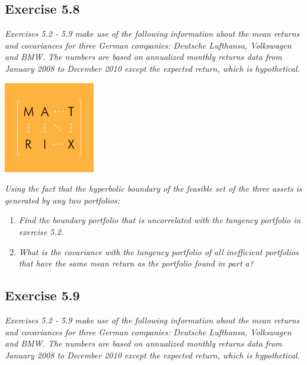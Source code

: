 \documentclass[]{book}
\theoremstyle{definition}
\theoremstyle{definition}
\theoremstyle{remark}
\begin{document}
\subsection{Exercise 5.8}\label{exercise-5.8}

\emph{Exercises 5.2 - 5.9 make use of the following information about
the mean returns and covariances for three German companies: Deutsche
Lufthansa, Volkswagen and BMW. The numbers are based on annualized
monthly returns data from January 2008 to December 2010 except the
expected return, which is hypothetical.} \citep[p.159]{book}

\begin{center}\includegraphics[width=150px]{figures/matrix} \end{center}

\emph{Using the fact that the hyperbolic boundary of the feasible set of
the three assets is generated by any two portfolios:}
\citep[p.160]{book}

\begin{enumerate}
\def\labelenumi{\alph{enumi}.}
\item
  \emph{Find the boundary portfolio that is uncorrelated with the
  tangency portfolio in exercise 5.2.} \citep[p.160]{book}
\item
  \emph{What is the covariance with the tangency portfolio of all
  inefficient portfolios that have the same mean return as the portfolio
  found in part a?} \citep[p.160]{book}
\end{enumerate}

\subsection{Exercise 5.9}\label{exercise-5.9}

\emph{Exercises 5.2 - 5.9 make use of the following information about
the mean returns and covariances for three German companies: Deutsche
Lufthansa, Volkswagen and BMW. The numbers are based on annualized
monthly returns data from January 2008 to December 2010 except the
expected return, which is hypothetical.} \citep[p.159]{book}
\end{document}
